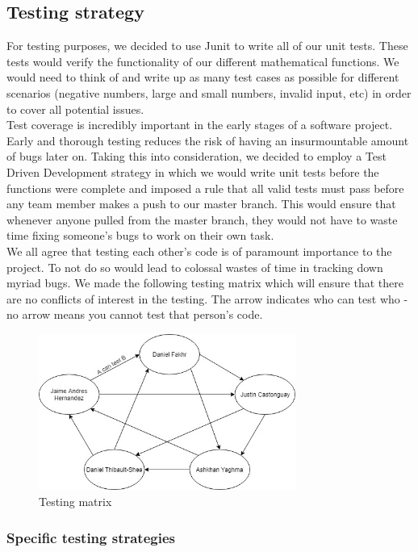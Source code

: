 \documentclass{article}
\begin{document}
\subsection{Testing strategy}

For testing purposes, we decided to use Junit to write all of our unit tests. These tests would verify the functionality of our different mathematical functions. We would need to think of and write up as many test cases as possible for different scenarios (negative numbers, large and small numbers, invalid input, etc) in order to cover all potential issues. \\

Test coverage is incredibly important in the early stages of a software project. Early and thorough testing reduces the risk of having an insurmountable amount of bugs later on. Taking this into consideration, we decided to employ a Test Driven Development strategy in which we would write unit tests before the functions were complete and imposed a rule that all valid tests must pass before any team member makes a push to our master branch. This would ensure that whenever anyone pulled from the master branch, they would not have to waste time fixing someone's bugs to work on their own task. \\

We all agree that testing each other's code is of paramount importance to the project. To not do so would lead to colossal wastes of time in tracking down myriad bugs. We made the following testing matrix which will ensure that there are no conflicts of interest in the testing. The arrow indicates who can test who - no arrow means you cannot test that person's code.

\begin{figure}[!h]
\caption{Testing matrix}
\centering
\includegraphics[width=0.75\textwidth]{TestingMatrix}
\end{figure}

\subsubsection{Specific testing strategies}
\end{document}
